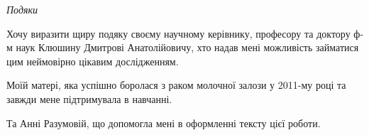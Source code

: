 \documentclass[
11pt, %
oneside, %
english, ukrainian, %
singlespacing, %
parskip, %
headsepline, %
]{MastersDoctoralThesis} %
\begin{document}
\begin{acknowledgements}

\begin{center}{\huge\textit{Подяки}\par}\end{center}

Хочу виразити щиру подяку своєму научному керівнику, професору та доктору ф-м наук Клюшину Дмитрові Анатолійовичу, хто надав мені можливість займатися цим неймовірно цікавим дослідженням.

Моїй матері, яка успішно боролася з раком молочної залози у 2011-му році та завжди мене підтримувала в навчанні.

Та Анні Разумовій, що допомогла мені в оформленні тексту цієї роботи.

\end{acknowledgements}


\tableofcontents %







\end{document}
